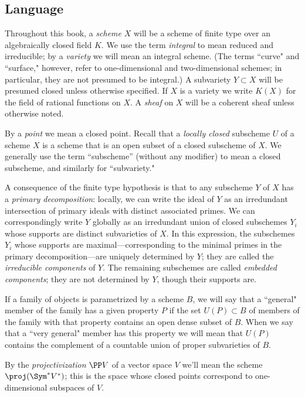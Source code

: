 \subsection{Language}
 

Throughout this book, a \emph{scheme} $X$ will be a scheme of finite type over an algebraically closed field
$K$. We use the term \emph{integral} to mean reduced and irreducible; by a \emph{variety} we will mean an integral scheme. (The terms ``curve" and ``surface," however, refer to one-dimensional and two-dimensional schemes; in particular, they are not presumed to be integral.) A subvariety $Y \subset X$ will be presumed closed unless otherwise specified.
 If $X$ is a variety we write $K(X)$ for the field of rational functions on $X$. A \emph{sheaf} on $X$ will be a coherent sheaf unless otherwise noted.
 
By a \emph{point}
we mean a closed point. 
Recall that a \emph{locally closed} subscheme $U$ of a scheme $X$ is 
a scheme that is an open subset of a closed subscheme of $X$. We generally use the term
``subscheme'' (without any modifier) to mean a closed subscheme, and similarly for ``subvariety."

A consequence of the finite type hypothesis
is that to any subscheme $Y$ of 
$X$ has a \emph{primary decomposition}: locally, we can write the ideal of $Y$ as an irredundant intersection of primary ideals with distinct associated primes. We can correspondingly write $Y$ globally as an irredundant union of closed subschemes $Y_i$ whose supports are distinct subvarieties of $X$. In this expression, the subschemes $Y_i$ whose supports are maximal---corresponding to the minimal primes in the primary decomposition---are uniquely determined by $Y$; they are called the \emph{irreducible components} of $Y$. The remaining subschemes are called \emph{embedded components}; they are not determined by $Y$, though their supports are.

If a family of objects is parametrized by a scheme $B$, we will say that a ``general" member of the family has a given property $P$ if the set $U(P) \subset B$ of members of the family with that property contains an open dense subset of $B$. When we say that a ``very general" member has this property  we will mean that $U(P)$ contains the complement of a countable union of proper subvarieties of $B$.


By the \emph{projectivization} $\PP V$ of a vector space $V$ we'll mean the scheme $\proj(\Sym^* V^*)$; this is the space whose closed points correspond to one-dimensional subspaces of $V$.

